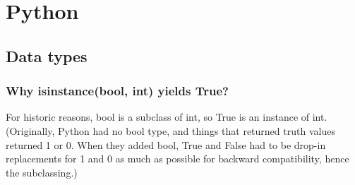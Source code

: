 \chapter{   Python}

\graphicspath{{./images/python/}}

\section{Data types}

\subsection{Why isinstance(bool, int) yields True?}
For historic reasons, bool is a subclass of int, so True is an instance of int. (Originally, Python had no bool type, and things that returned truth values returned 1 or 0. When they added bool, True and False had to be drop-in replacements for 1 and 0 as much as possible for backward compatibility, hence the subclassing.)